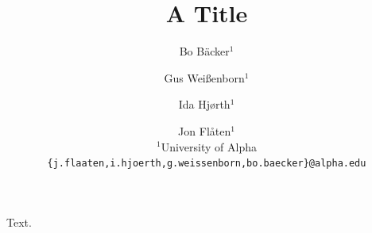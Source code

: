 \documentclass{article}
\title{A Title}
\author{%
  Bo B\"acker$^{1}$ \and Gus Wei{\ss}enborn$^{1}$ \and Ida Hj\o rth$^{1}$ \and Jon Fl\aa ten$^{1}$ \\
  $^1$University of Alpha \\
  \texttt{\{j.flaaten,i.hjoerth,g.weissenborn,bo.baecker\}@alpha.edu}
}
\begin{document}
\maketitle
Text.
\end{document}

